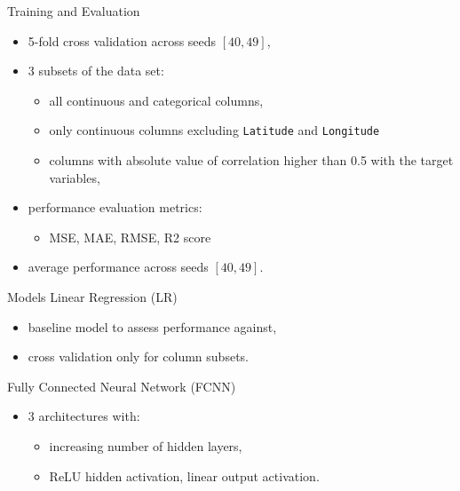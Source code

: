 \documentclass[xcolor=table]{beamer} %
\begin{document}
\begin{frame}{Training and Evaluation}
  \vspace{-1cm}
  \begin{itemize}
      \item 5-fold cross validation across seeds $[40, 49]$,
      \item 3 subsets of the data set:
        \begin{itemize}
        	\footnotesize
            \item all continuous and categorical columns,
            \item only continuous columns excluding \texttt{Latitude} and \texttt{Longitude}
            \item columns with absolute value of correlation higher than 0.5 with the target variables,
        \end{itemize}
      \item performance evaluation metrics:
      	\begin{itemize}
      		\footnotesize
      		\item MSE, MAE, RMSE, R2 score
		\end{itemize}       
      \item average performance across seeds $[40, 49]$.
  \end{itemize}
\end{frame}

\begin{frame}{Models}
  \vspace{-0.5cm}
  Linear Regression (LR)
  \begin{itemize}
      \item baseline model to assess performance against,
      \item cross validation only for column subsets.
  \end{itemize}
  Fully Connected Neural Network (FCNN)
  \begin{itemize}
      \item 3 architectures with:
        \begin{itemize}
        	\footnotesize
            \item increasing number of hidden layers,
            \item ReLU hidden activation, linear output activation.
        \end{itemize}
  \end{itemize}
\end{frame}
\end{document}
